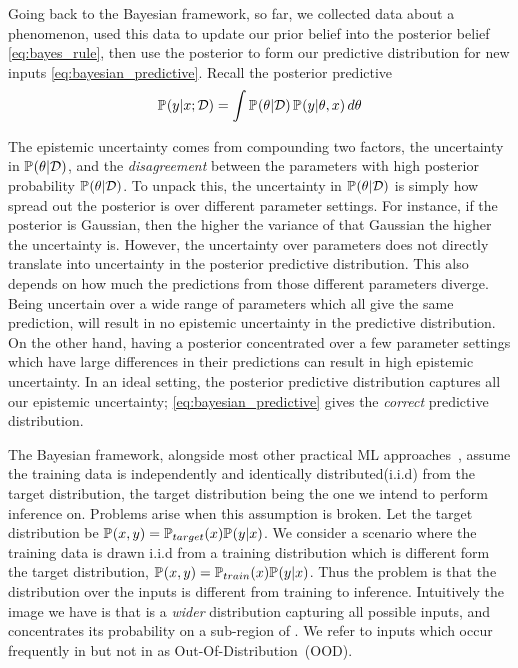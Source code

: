 Going back to the Bayesian framework, so far, we collected data about a phenomenon, used this data to update our prior belief into the posterior belief \cref{eq:bayes_rule}, then use the posterior to form our predictive distribution for new inputs \cref{eq:bayesian_predictive}.
Recall the posterior predictive
$$
    \pdf{y|x; \mathcal{D}}=  \int \pdf{\theta | \mathcal{D}}\, \pdf{y|\theta, x} \, d\theta
$$


The epistemic uncertainty comes from compounding two factors, the uncertainty in $\pdf{\theta | \mathcal{D}}$, and the \emph{disagreement} between the parameters with high posterior probability  $\pdf{\theta | \mathcal{D}}$. To unpack this, the uncertainty in $\pdf{\theta | \mathcal{D}}$ is simply how spread out the posterior is over different parameter settings. For instance, if the posterior is Gaussian, then the higher the variance of that Gaussian the higher the uncertainty is. However, the uncertainty over parameters does not directly translate into uncertainty in the posterior predictive distribution. This also depends on how much the predictions from those different parameters diverge. Being uncertain over a wide range of parameters which all give the same prediction, will result in no epistemic uncertainty in the predictive distribution. On the other hand, having a posterior concentrated over a few parameter settings which have large differences in their predictions can result in high epistemic uncertainty. In an ideal setting, the posterior predictive distribution captures all our epistemic uncertainty; \cref{eq:bayesian_predictive} gives the \emph{correct} predictive distribution.



The Bayesian framework, alongside most other practical ML approaches~\citep[chapter~5]{goodfellow2016deep}, assume the training data is independently and identically distributed(i.i.d) from the target distribution, the target distribution being the one we intend to perform inference on. Problems arise when this assumption is broken.
Let the target distribution be $\pdf{x,y} = \pdf[target]{x} \pdf{y|x}$.
We consider a scenario where the training data is drawn i.i.d from a training distribution which is different form the target distribution, $\pdf{x,y} = \pdf[train]{x} \pdf{y|x}$. Thus the problem is that the distribution over the inputs is different from training to inference. 
Intuitively the image we have is that  is a \emph{wider} distribution capturing all possible inputs, and  concentrates its probability on a sub-region of . We refer to inputs which occur frequently in  but not in  as Out-Of-Distribution~(OOD).

